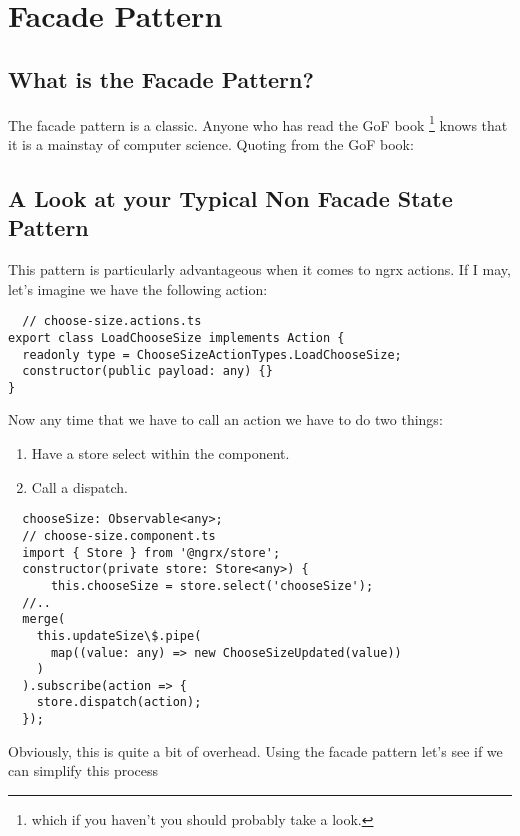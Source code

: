 
\section{ Facade Pattern }

\subsection{ What is the Facade Pattern? }
The facade pattern is a classic. Anyone who has read the GoF book \footnote{
which if you haven't you should probably take a look.} knows that it is a
mainstay of computer science. Quoting from the GoF book:


\subsection{ A Look at your Typical Non Facade State Pattern  }
This pattern is particularly advantageous when it comes to ngrx actions. If I
may, let's imagine we have the following action:

\begin{lstlisting}
  // choose-size.actions.ts
export class LoadChooseSize implements Action {
  readonly type = ChooseSizeActionTypes.LoadChooseSize;
  constructor(public payload: any) {}
}
\end{lstlisting}

Now any time that we have to call an action we have to do two things:
\begin{enumerate}
  \item Have a store select within the component.
  \item Call a dispatch.
\end{enumerate}

\begin{lstlisting}
  chooseSize: Observable<any>;
  // choose-size.component.ts
  import { Store } from '@ngrx/store';
  constructor(private store: Store<any>) {
      this.chooseSize = store.select('chooseSize');
  //..
  merge(
    this.updateSize\$.pipe(
      map((value: any) => new ChooseSizeUpdated(value))
    )
  ).subscribe(action => {
    store.dispatch(action);
  });
\end{lstlisting}

Obviously, this is quite a bit of overhead. Using the facade pattern let's see
if we can simplify this process

